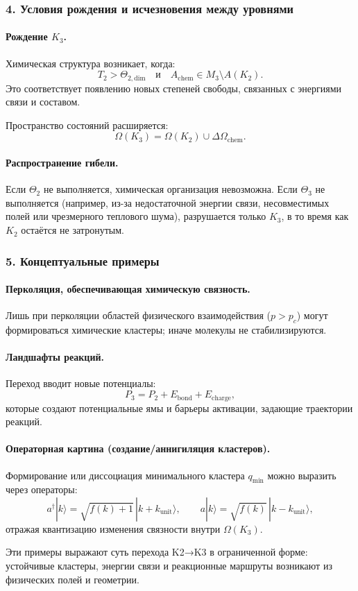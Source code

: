 \subsubsection{4. Условия рождения и исчезновения между уровнями}

\paragraph{Рождение \texorpdfstring{$K_3$}{K_3}.}
Химическая структура возникает, когда:
\[
T_2 > \Theta_{2,\mathrm{dim}}
\quad \text{и} \quad
A_{\mathrm{chem}} \in M_3 \setminus A(K_2).
\]
Это соответствует появлению новых степеней свободы, связанных с
энергиями связи и составом.

Пространство состояний расширяется:
\[
\Omega(K_3) = \Omega(K_2) \cup \Delta\Omega_{\mathrm{chem}}.
\]

\paragraph{Распространение гибели.}
Если $\Theta_2$ не выполняется, химическая организация невозможна.
Если $\Theta_3$ не выполняется (например, из-за недостаточной энергии связи,
несовместимых полей или чрезмерного теплового шума), разрушается только $K_3$,
в то время как $K_2$ остаётся не затронутым.

\subsubsection{5. Концептуальные примеры}

\paragraph{Перколяция, обеспечивающая химическую связность.}
Лишь при перколяции областей физического взаимодействия ($p>p_c$) могут
формироваться химические кластеры; иначе молекулы не стабилизируются.

\paragraph{Ландшафты реакций.}
Переход вводит новые потенциалы:
\[
P_3 = P_2 + E_{\mathrm{bond}} + E_{\mathrm{charge}},
\]
которые создают потенциальные ямы и барьеры активации, задающие траектории реакций.

\paragraph{Операторная картина (создание/аннигиляция кластеров).}
Формирование или диссоциация минимального кластера $q_{\mathrm{min}}$ можно
выразить через операторы:
\[
a^{\dagger} |k\rangle = \sqrt{f(k)+1}\,|k+k_{\mathrm{unit}}\rangle,
\qquad
a |k\rangle = \sqrt{f(k)}\,|k-k_{\mathrm{unit}}\rangle,
\]
отражая квантизацию изменения связности внутри $\Omega(K_3)$.

Эти примеры выражают суть перехода K2→K3 в ограниченной форме:
устойчивые кластеры, энергии связи и реакционные маршруты возникают из
физических полей и геометрии.
